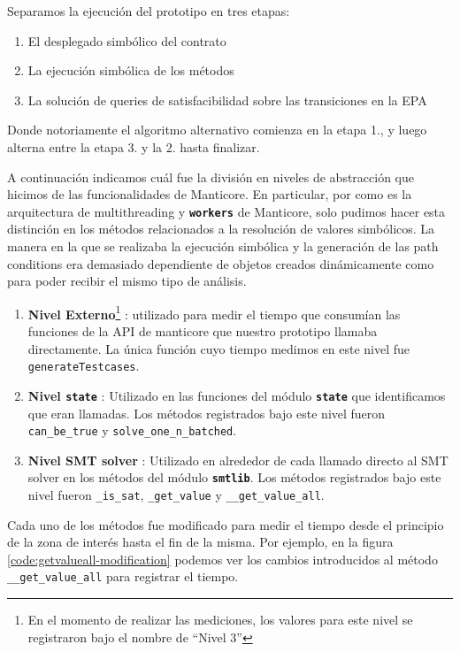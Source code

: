 Separamos la ejecución del prototipo en tres etapas:
\begin{enumerate}
    \item El desplegado simbólico del contrato
    \item La ejecución simbólica de los métodos
    \item La solución de queries de satisfacibilidad sobre las transiciones en la EPA
\end{enumerate}
Donde notoriamente el algoritmo alternativo comienza en la etapa 1., y luego alterna entre la etapa 3. y la 2. hasta finalizar.

A continuación indicamos cuál fue la división en niveles de abstracción que hicimos de las funcionalidades de Manticore.
En particular, por como es la arquitectura de multithreading y \textbf{\texttt{workers}} de Manticore, solo pudimos hacer esta distinción en los métodos relacionados a la resolución de valores simbólicos.
La manera en la que se realizaba la ejecución simbólica y la generación de las path conditions era demasiado dependiente de objetos creados dinámicamente como para poder recibir el mismo tipo de análisis.
\begin{enumerate}
    \item \textbf{Nivel Externo}\footnote{En el momento de realizar las mediciones, los valores para este nivel se registraron bajo el nombre de  ``Nivel 3''} : utilizado para medir el tiempo que consumían las funciones de la API de manticore que nuestro prototipo llamaba directamente.
          La única función cuyo tiempo medimos en este nivel fue \texttt{generateTestcases}.
    \item \textbf{Nivel \texttt{state}} : Utilizado en las funciones del módulo \textbf{\texttt{state}} que identificamos que eran llamadas.
          Los métodos registrados bajo este nivel fueron \texttt{can\_be\_true} y \texttt{solve\_\allowbreak one\_\allowbreak n\_\allowbreak batched}.
    \item \textbf{Nivel SMT solver} : Utilizado en alrededor de cada llamado directo al SMT solver en los métodos del módulo \textbf{\texttt{smtlib}}.
          Los métodos registrados bajo este nivel fueron \texttt{\_is\_sat}, \texttt{\_get\_value} y \texttt{\_\_get\_value\_all}.
\end{enumerate}
Cada uno de los métodos fue modificado para medir el tiempo desde el principio de la zona de interés hasta el fin de la misma.
Por ejemplo, en la figura \ref{code:getvalueall-modification} podemos ver los cambios introducidos al método \texttt{\_\_get\_value\_all} para registrar el tiempo.

